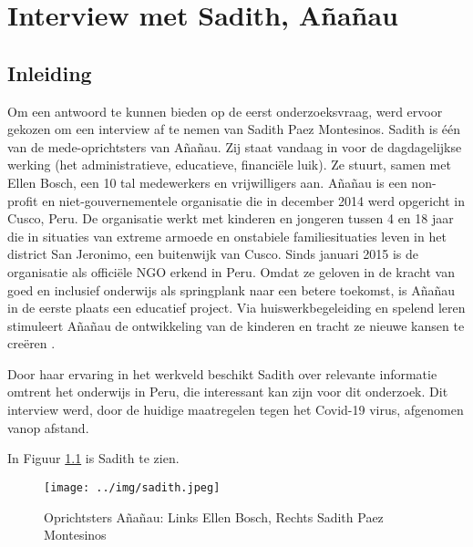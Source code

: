 
\chapter{Interview met Sadith, Añañau}
\label{ch:interviewSadith}

\section{Inleiding}
Om een antwoord te kunnen bieden op de eerst onderzoeksvraag, werd ervoor gekozen om een interview af te nemen van Sadith Paez Montesinos. Sadith is één van de mede-oprichtsters van Añañau. Zij staat vandaag in voor de dagdagelijkse werking (het administratieve, educatieve, financiële luik). Ze stuurt, samen met Ellen Bosch, een 10 tal medewerkers en vrijwilligers aan. Añañau is een non-profit en niet-gouvernementele organisatie die in december 2014 werd opgericht in Cusco, Peru. De organisatie werkt met kinderen en jongeren tussen 4 en 18 jaar die in situaties van extreme armoede en onstabiele familiesituaties leven in het district San Jeronimo, een buitenwijk van Cusco. Sinds januari 2015 is de organisatie als officiële NGO erkend in Peru. Omdat ze geloven in de kracht van goed en inclusief onderwijs als springplank naar een betere toekomst, is Añañau in de eerste plaats een educatief project. Via huiswerkbegeleiding en spelend leren stimuleert Añañau de ontwikkeling van de kinderen en tracht ze nieuwe kansen te creëren \autocite{Ananau2020}.

Door haar ervaring in het werkveld beschikt Sadith over relevante informatie omtrent het onderwijs in Peru, die interessant kan zijn voor dit onderzoek. Dit interview werd, door de huidige maatregelen tegen het Covid-19 virus, afgenomen vanop afstand.

In Figuur \ref{sadith} is Sadith te zien.

 \begin{figure}[h!]
	\texttt{[image: ../img/sadith.jpeg]}
	\caption{Oprichtsters Añañau: Links Ellen Bosch, Rechts Sadith Paez Montesinos} \autocite{Ananau2020}
	\label{sadith}
\end{figure}

